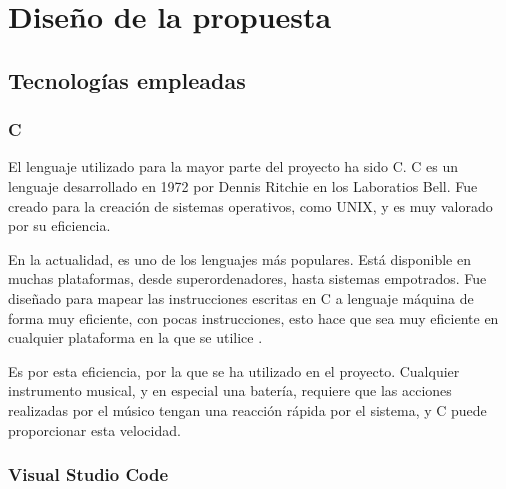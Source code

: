 
\chapter{Diseño de la propuesta} %
\label{cha:Diseno}


    \section{Tecnologías empleadas} %
    \label{sec:TecnologiasEmpleadas}

        \subsection{C} %
        \label{sub:CLanguage}

            El lenguaje utilizado para la mayor parte del proyecto ha sido C. C es un lenguaje desarrollado en 1972 por
            Dennis Ritchie en los Laboratios Bell. Fue creado para la creación de sistemas operativos, como UNIX, y es
            muy valorado por su eficiencia.

            En la actualidad, es uno de los lenguajes más populares. Está disponible en muchas plataformas, desde
            superordenadores, hasta sistemas empotrados. Fue diseñado para mapear las instrucciones escritas en C a
            lenguaje máquina de forma muy eficiente, con pocas instrucciones, esto hace que sea muy eficiente en
            cualquier plataforma en la que se utilice \cite{wikipedia_c_language}.

            Es por esta eficiencia, por la que se ha utilizado en el proyecto. Cualquier instrumento musical, y en
            especial una batería, requiere que las acciones realizadas por el músico tengan una reacción rápida por el
            sistema, y C puede proporcionar esta velocidad.


        \subsection{Visual Studio Code} %
        \label{sub:VisualStudioCode}

